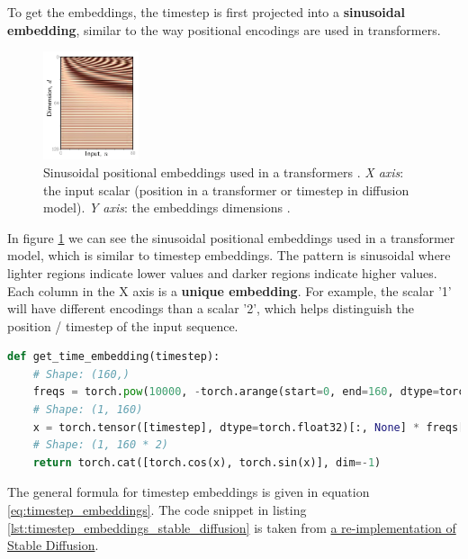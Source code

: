 To get the embeddings, the timestep is first projected into a \textbf{sinusoidal embedding}, similar to the way positional encodings are used in transformers.

\begin{figure}[h]
    \centering
    \includegraphics[width=0.25\textwidth]{images/diffusion_models/stable_diffusion/positional_encodings.png}
    \caption{Sinusoidal positional embeddings used in a transformers \cite{understanding_deep_learning_book_2024}. \textit{X axis}: the input scalar (position in a transformer or timestep in diffusion model). \textit{Y axis}: the embeddings dimensions \cite{understanding_deep_learning_book_2024}.}
    \label{fig:sinusoidal_embeddings}
\end{figure}

In figure \ref{fig:sinusoidal_embeddings} we can see the sinusoidal positional embeddings used in a transformer model, which is similar to timestep embeddings. The pattern is sinusoidal where lighter regions indicate lower values and darker regions indicate higher values. Each column in the X axis is a \textbf{unique embedding}. For example, the scalar '1' will have different encodings than a scalar '2', which helps distinguish the position / timestep of the input sequence.

\begin{lstlisting}[language=Python, breaklines=true, caption={Timestep embeddings in Stable Diffusion: we convert the timestep to an embedding.}, label={lst:timestep_embeddings_stable_diffusion}]
def get_time_embedding(timestep):
    # Shape: (160,)
    freqs = torch.pow(10000, -torch.arange(start=0, end=160, dtype=torch.float32) / 160) 
    # Shape: (1, 160)
    x = torch.tensor([timestep], dtype=torch.float32)[:, None] * freqs[None]
    # Shape: (1, 160 * 2)
    return torch.cat([torch.cos(x), torch.sin(x)], dim=-1)
\end{lstlisting}

The general formula for timestep embeddings is given in equation \ref{eq:timestep_embeddings}. The code snippet in listing \ref{lst:timestep_embeddings_stable_diffusion} is taken from \href{https://github.com/hkproj/pytorch-stable-diffusion/blob/e0cb06de011787cdf13eed7b4287ad8410491149/sd/pipeline.py#L164}{a re-implementation of Stable Diffusion}.

